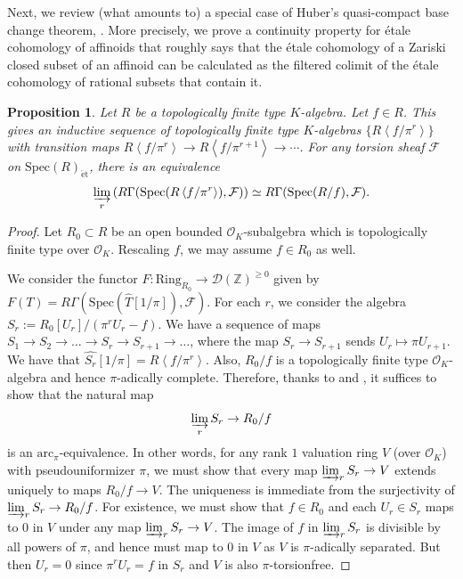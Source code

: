 \documentclass[reqno]{amsart}
\newcommand{\sF}{\mathcal{F}}
\newcommand{\spec}{\mathrm{Spec}}
\newcommand{\et}{\mathrm{\acute{e}t}}
\newcommand{\arc}{\mathrm{arc}}
\newcommand{\D}{\mathcal{D}}
\newtheorem{proposition}[theorem]{Proposition}
\theoremstyle{definition}
\begin{document}
Next, we review (what amounts to) a special case of Huber's quasi-compact base
change theorem, \cite[Sec.~4.4]{HuberBook}. More precisely, we prove a continuity property for \'etale cohomology of affinoids that roughly says that the \'etale cohomology of a Zariski closed subset of an affinoid can be calculated as the filtered colimit of the \'etale cohomology of rational subsets that contain it. 





\begin{proposition} 
\label{qcbase}
Let $R$ be a topologically finite type $K$-algebra. Let $f \in R$. This gives an inductive sequence of topologically finite type $K$-algebras $\{R\left \langle f/\pi^r\right\rangle\}$ with transition maps $R\left \langle f/\pi^r\right\rangle \to R\left \langle f/\pi^{r+1}\right\rangle \to \cdots$. For any torsion sheaf $\sF$ on $\spec(R)_{\et}$, there is an equivalence 
\begin{equation} \label{qceq} \varinjlim_r \left(R \Gamma( \spec( R\left \langle f/\pi^r\right\rangle )
, \sF) \right) \simeq R \Gamma(\spec(R/f), \sF). \end{equation}
\end{proposition} 
\begin{proof} 
Let $R_0 \subset R$ be an open bounded $\mathcal{O}_K$-subalgebra which is topologically finite type over $\mathcal{O}_K$. 
Rescaling $f$, we may assume $f \in R_0$ as well. 

We consider the functor $F\colon  \mathrm{Ring}_{R_0} \to \D(\mathbb{Z})^{\geq 0}$ given by
$F(T) = R \Gamma( \spec( \widehat{T}[1/\pi]), \sF)$. For each $r$, we consider the algebra $S_r := R_0[U_r]/( \pi^r U_r - f)$. 
We have a sequence of maps 
$S_1 \to S_2 \to \dots \to S_r \to S_{r+1} \to \dots$, where the map $S_r \to
S_{r+1}$ sends $U_r \mapsto \pi U_{r+1}$.  We have that 
$\widehat{S_r}[1/\pi] = R\left \langle f/\pi^r\right\rangle $. Also, $R_0/f$ is
a topologically finite type $\mathcal{O}_K$-algebra and hence $\pi$-adically complete.
Therefore, thanks to  and , it suffices to show that the natural map 
\[ \varinjlim_r S_r \to R_0/f  \]
 is an $\arc_\pi$-equivalence. In other words, for any rank $1$ valuation ring $V$ (over $\mathcal{O}_K$) with pseudouniformizer $\pi$, we must show that every map $\varinjlim_r S_r \to V$ extends uniquely to maps $R_0/f \to V$. The uniqueness is immediate from the surjectivity of $\varinjlim_r S_r \to R_0/f$. For existence, we must show that $f \in R_0$ and each $U_r \in S_r$ maps to $0$ in $V$ under any map $\varinjlim_r S_r \to V$. The image of $f$ in $\varinjlim_r S_r$ is divisible by all powers of $\pi$, and hence must map to $0$ in $V$ as $V$ is $\pi$-adically separated. But then $U_r = 0$ since $\pi^r U_r = f$ in $S_r$ and $V$ is also $\pi$-torsionfree.
\end{proof} 
\end{document}
